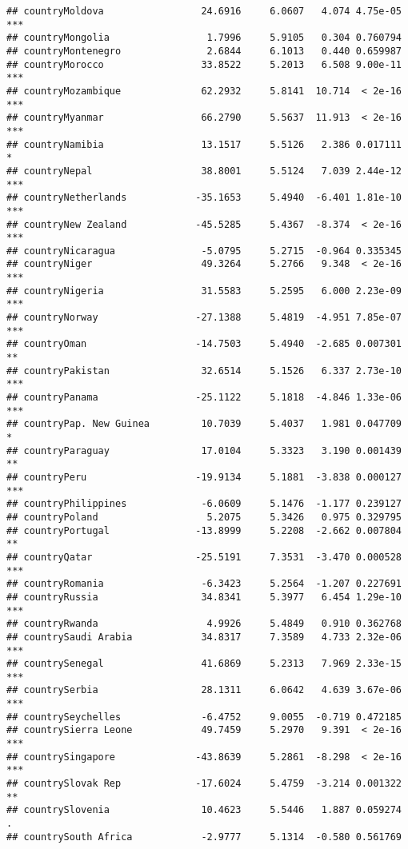 \documentclass[
  11pt,
]{article}
\begin{document}
\begin{verbatim}
## countryMoldova                 24.6916     6.0607   4.074 4.75e-05 ***
## countryMongolia                 1.7996     5.9105   0.304 0.760794    
## countryMontenegro               2.6844     6.1013   0.440 0.659987    
## countryMorocco                 33.8522     5.2013   6.508 9.00e-11 ***
## countryMozambique              62.2932     5.8141  10.714  < 2e-16 ***
## countryMyanmar                 66.2790     5.5637  11.913  < 2e-16 ***
## countryNamibia                 13.1517     5.5126   2.386 0.017111 *  
## countryNepal                   38.8001     5.5124   7.039 2.44e-12 ***
## countryNetherlands            -35.1653     5.4940  -6.401 1.81e-10 ***
## countryNew Zealand            -45.5285     5.4367  -8.374  < 2e-16 ***
## countryNicaragua               -5.0795     5.2715  -0.964 0.335345    
## countryNiger                   49.3264     5.2766   9.348  < 2e-16 ***
## countryNigeria                 31.5583     5.2595   6.000 2.23e-09 ***
## countryNorway                 -27.1388     5.4819  -4.951 7.85e-07 ***
## countryOman                   -14.7503     5.4940  -2.685 0.007301 ** 
## countryPakistan                32.6514     5.1526   6.337 2.73e-10 ***
## countryPanama                 -25.1122     5.1818  -4.846 1.33e-06 ***
## countryPap. New Guinea         10.7039     5.4037   1.981 0.047709 *  
## countryParaguay                17.0104     5.3323   3.190 0.001439 ** 
## countryPeru                   -19.9134     5.1881  -3.838 0.000127 ***
## countryPhilippines             -6.0609     5.1476  -1.177 0.239127    
## countryPoland                   5.2075     5.3426   0.975 0.329795    
## countryPortugal               -13.8999     5.2208  -2.662 0.007804 ** 
## countryQatar                  -25.5191     7.3531  -3.470 0.000528 ***
## countryRomania                 -6.3423     5.2564  -1.207 0.227691    
## countryRussia                  34.8341     5.3977   6.454 1.29e-10 ***
## countryRwanda                   4.9926     5.4849   0.910 0.362768    
## countrySaudi Arabia            34.8317     7.3589   4.733 2.32e-06 ***
## countrySenegal                 41.6869     5.2313   7.969 2.33e-15 ***
## countrySerbia                  28.1311     6.0642   4.639 3.67e-06 ***
## countrySeychelles              -6.4752     9.0055  -0.719 0.472185    
## countrySierra Leone            49.7459     5.2970   9.391  < 2e-16 ***
## countrySingapore              -43.8639     5.2861  -8.298  < 2e-16 ***
## countrySlovak Rep             -17.6024     5.4759  -3.214 0.001322 ** 
## countrySlovenia                10.4623     5.5446   1.887 0.059274 .  
## countrySouth Africa            -2.9777     5.1314  -0.580 0.561769    

\end{verbatim}
\end{document}
